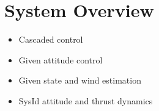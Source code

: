 \ETHslide
\section*{System Overview}
\vspace*{\fill}

\begin{figure}[h]
\centering
\scalebox{1}{
%

}
\end{figure}
\begin{itemize}
\item[\ETHitem] Cascaded control
\item[\ETHitem] Given attitude control
\item[\ETHitem] Given state and wind estimation
\item[\ETHitem] SysId attitude and thrust dynamics
\end{itemize}

\vspace*{\fill}
\clearpage